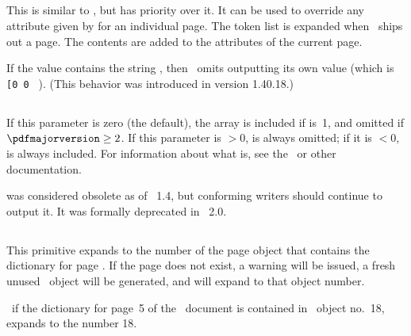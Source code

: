 \documentclass{pdftexmanual}
\begin{document}
\subsection{}

This is similar to , but has priority over it.
It can be used to override any attribute given by 
for an individual page. The token list is expanded when \PDFTEX\ ships out
a page. The contents are added to the attributes of the current page.

If the  value contains the string ,
then \PDFTEX\ omits outputting its own  value (which is
\verb|[0 0 | \type{]}).  (This behavior was introduced in version
1.40.18.)

\subsection{}

If this parameter is zero (the default), the  array is
included if  is~1, and omitted if
$\mbox{\tt \textbackslash pdfmajorversion}\ge2$. If this parameter is $>0$, 
is always omitted; if it is $<0$,  is always
included. For information about what  is, see the
\PDFReference\ or other documentation.

 was considered obsolete as of \PDF~1.4, but conforming
writers should continue to output it. It was formally deprecated in
\PDF~2.0.

\subsection{}

This primitive expands to the number of the page object that contains
the dictionary for page . If the page
 does not exist, a warning will be issued,
a fresh unused \PDF\ object will be generated, and 
will expand to that object number.

\Eg\ if the dictionary for page~5 of the \TEX\ document is contained in
\PDF\ object no.~18,  expands to the number 18.
\end{document}
